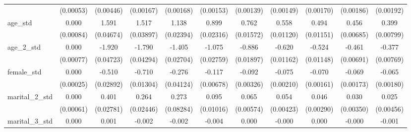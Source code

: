 {\begin{tabular}{l*{10}{c}}
                    &   (0.00053)         &   (0.00446)         &   (0.00167)         &   (0.00168)         &   (0.00153)         &   (0.00139)         &   (0.00149)         &   (0.00170)         &   (0.00186)         &   (0.00192)         \\
age\_std             &       0.000         &       1.591\sym{***}&       1.517\sym{***}&       1.138\sym{***}&       0.899\sym{***}&       0.762\sym{***}&       0.558\sym{***}&       0.494\sym{***}&       0.456\sym{***}&       0.399\sym{***}\\
                    &   (0.00084)         &   (0.04674)         &   (0.03897)         &   (0.02394)         &   (0.02316)         &   (0.01572)         &   (0.01120)         &   (0.01151)         &   (0.00685)         &   (0.00799)         \\
age\_2\_std           &       0.000         &      -1.920\sym{***}&      -1.790\sym{***}&      -1.405\sym{***}&      -1.075\sym{***}&      -0.886\sym{***}&      -0.620\sym{***}&      -0.524\sym{***}&      -0.461\sym{***}&      -0.377\sym{***}\\
                    &   (0.00077)         &   (0.04723)         &   (0.04294)         &   (0.02704)         &   (0.02759)         &   (0.01897)         &   (0.01162)         &   (0.01148)         &   (0.00691)         &   (0.00769)         \\
female\_std          &       0.000         &      -0.510\sym{***}&      -0.710\sym{***}&      -0.276\sym{***}&      -0.117\sym{***}&      -0.092\sym{***}&      -0.075\sym{***}&      -0.070\sym{***}&      -0.069\sym{***}&      -0.065\sym{***}\\
                    &   (0.00025)         &   (0.02892)         &   (0.01304)         &   (0.04124)         &   (0.00678)         &   (0.00326)         &   (0.00210)         &   (0.00161)         &   (0.00173)         &   (0.00180)         \\
marital\_2\_std       &       0.000         &       0.401\sym{***}&       0.264\sym{***}&       0.273\sym{***}&       0.095\sym{***}&       0.065\sym{***}&       0.054\sym{***}&       0.046\sym{***}&       0.030\sym{***}&       0.025\sym{***}\\
                    &   (0.00061)         &   (0.02781)         &   (0.02446)         &   (0.08284)         &   (0.01016)         &   (0.00574)         &   (0.00423)         &   (0.00290)         &   (0.00350)         &   (0.00456)         \\
marital\_3\_std       &       0.000         &       0.001\sym{***}&      -0.002\sym{***}&      -0.002\sym{***}&      -0.004\sym{***}&       0.000\sym{*}  &      -0.000         &       0.000         &      -0.000\sym{***}&      -0.001\sym{***}\\

\end{tabular}}
